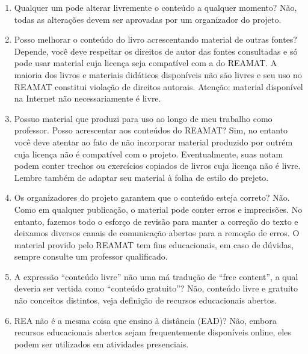 \documentclass[12pt]{report}
\begin{document}
\begin{enumerate}
\item Qualquer um pode alterar livremente o conteúdo a qualquer momento? 
Não, todas as alterações devem ser aprovadas por um organizador do projeto. 

\item Posso melhorar o conteúdo do livro acrescentando material de outras fontes? 
Depende, você deve respeitar os direitos de autor das fontes consultadas e só pode usar material cuja licença seja compatível com a do REAMAT. A maioria dos livros e materiais didáticos disponíveis não são livres e seu uso no REAMAT constitui violação de direitos autorais. Atenção: material disponível na Internet não necessariamente é livre.  

\item Possuo material que produzi para uso ao longo de meu trabalho como professor. Posso acrescentar aos conteúdos do REAMAT? 
Sim, no entanto você deve atentar ao fato de não incorporar material produzido por outrém cuja licença não é compatível com o projeto. Eventualmente, suas notam podem conter trechos ou exercícios copiados de livros cuja licença não é livre. Lembre também de adaptar seu material à folha de estilo do prejeto. 

\item Os organizadores do projeto garantem que o conteúdo esteja correto? 
Não. Como em qualquer publicação, o material pode conter erros e imprecisões. No entanto, fazemos todo o esforço de revisão para manter a correção do texto e deixamos diversos canais de comunicação abertos para a remoção de erros. O material provido pelo REAMAT tem fins educacionais, em caso de dúvidas, sempre consulte um professor qualificado. 

\item A expressão ``conteúdo livre'' não uma má tradução de ``free content'', a qual deveria ser vertida como ``conteúdo gratuito''? 
Não, conteúdo livre e gratuito não conceitos distintos, veja definição de recursos educacionais abertos. 

\item REA não é a mesma coisa que ensino à distância (EAD)?
Não, embora recursos educacionais abertos sejam frequentemente disponíveis online, eles podem ser utilizados em atividades presenciais.
\end{enumerate}
\end{document}
